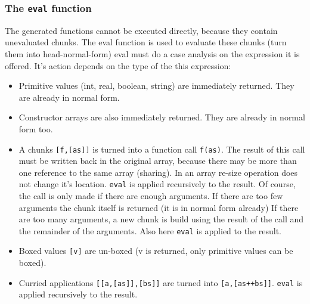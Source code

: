 \subsubsection{The \texttt{eval} function}
The generated \JS functions cannot be executed directly, because they contain unevaluated chunks.
The \textsf{eval} function is used to evaluate these chunks (turn them into head-normal-form)
\textsf{eval} must do a case analysis on the expression it is offered.
It's action depends on the type of the this expression:

\begin{itemize}
\item Primitive values (int, real, boolean, string) are immediately returned. They are already in normal form.
\item Constructor arrays  are also immediately returned. They are already in normal form too.
\item A chunks \texttt{[f,[as]]} is turned into a function call \texttt{f(as)}.
The result of this call must be written back in the original array, because there may be more than
one reference to the same array (sharing). In \JS an array re-size operation does not change it's location.  
\texttt{eval} is applied recursively to the result.
Of course, the call is only made if there are enough arguments. 
If there are too few arguments the chunk itself is returned (it is in normal form already)
If there are too many arguments, a new chunk
is build using the result of the call and the remainder of the arguments.
Also here \texttt{eval} is applied to the result. 
\item Boxed values \texttt{[v]} are un-boxed (v is returned, only primitive values can be boxed).
\item Curried applications \texttt{[[a,[as]],[bs]]} are turned into  \texttt{[a,[as++bs]]}.
\texttt{eval} is applied recursively to the result.
\end{itemize}

